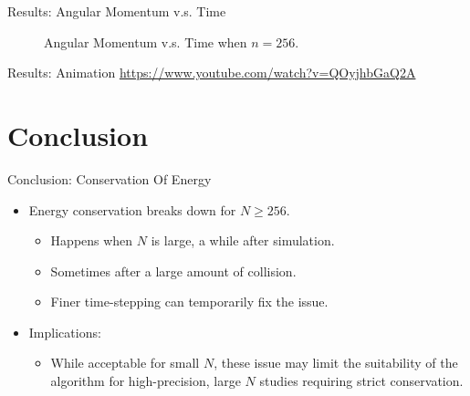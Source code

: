 \documentclass[10pt, xcolor = svgnames, aspectratio=43]{beamer} %
\begin{document}
\begin{frame}{Results: Angular Momentum v.s. Time}
\begin{figure}
\caption{Angular Momentum v.s. Time when $n = 256$.}
\label{A-T256}
\end{figure}
\end{frame}


\begin{frame}{Results: Animation}
\url{https://www.youtube.com/watch?v=QOyjhbGaQ2A}
\end{frame}







\section{Conclusion}

\begin{frame}{Conclusion: Conservation Of Energy}
\begin{itemize}
    \item Energy conservation breaks down for $N \geq 256$.
    \begin{itemize}
        \item Happens when $N$ is large, a while after simulation.
        \item Sometimes after a large amount of collision. 
        \item Finer time-stepping can temporarily fix the issue.
    \end{itemize}
    \item Implications:
    \begin{itemize}
        \item While acceptable for small $N$, these issue may limit the suitability of the algorithm for high-precision, large $N$ studies requiring strict conservation.
    \end{itemize}
\end{itemize}
\end{frame}
\end{document}

